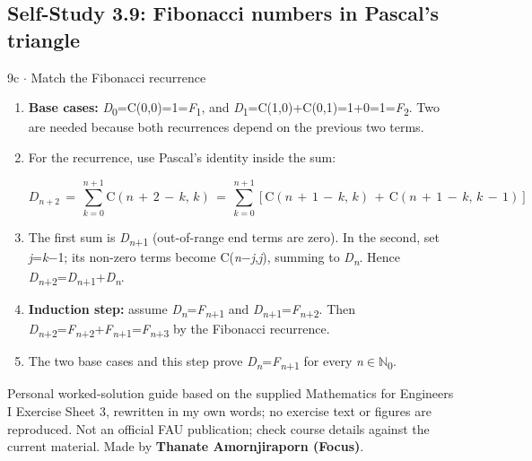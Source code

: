 \documentclass[11pt]{article}
\begin{document}
\begin{keepsection}\subsection{Self-Study 3.9: Fibonacci numbers in Pascal’s triangle}

\begin{workedbox}{9c \ensuremath{\cdot} Match the Fibonacci recurrence}
\begin{enumerate}
\item \textbf{Base cases:} \textit{D}\textsubscript{0}=C(0,0)=1=\textit{F}\textsubscript{1}, and \textit{D}\textsubscript{1}=C(1,0)+C(0,1)=1+0=1=\textit{F}\textsubscript{2}. Two are needed because both recurrences depend on the previous two terms.
\item {}
For the recurrence, use Pascal’s identity inside the sum:

\begin{equation*}{D}_{{n}+2}\, =\, \sum_{{k}=0}^{{n}+1} \mathrm{C}({n}\, +\, 2\, -\, {k},\, {k})\, =\, \sum_{{k}=0}^{{n}+1} [\mathrm{C}({n}\, +\, 1\, -\, {k},\, {k})\, +\, \mathrm{C}({n}\, +\, 1\, -\, {k},\, {k}\, -\, 1)]\end{equation*}
\item The first sum is \textit{D}\textsubscript{\textit{n}+1} (out-of-range end terms are zero). In the second, set \textit{j}=\textit{k}\ensuremath{-}1; its non-zero terms become C(\textit{n}\ensuremath{-}\textit{j},\textit{j}), summing to \textit{D}\textsubscript{\textit{n}}. Hence \textit{D}\textsubscript{\textit{n}+2}=\textit{D}\textsubscript{\textit{n}+1}+\textit{D}\textsubscript{\textit{n}}.
\item \textbf{Induction step:} assume \textit{D}\textsubscript{\textit{n}}=\textit{F}\textsubscript{\textit{n}+1} and \textit{D}\textsubscript{\textit{n}+1}=\textit{F}\textsubscript{\textit{n}+2}. Then \textit{D}\textsubscript{\textit{n}+2}=\textit{F}\textsubscript{\textit{n}+2}+\textit{F}\textsubscript{\textit{n}+1}=\textit{F}\textsubscript{\textit{n}+3} by the Fibonacci recurrence.
\item The two base cases and this step prove \textit{D}\textsubscript{\textit{n}}=\textit{F}\textsubscript{\textit{n}+1} for every \textit{n}\ensuremath{\in}\ensuremath{\mathbb{N}}\textsubscript{0}.
\end{enumerate}
\end{workedbox}

\end{keepsection}

\vfill{\small Personal worked-solution guide based on the supplied Mathematics for Engineers I Exercise Sheet 3, rewritten in my own words; no exercise text or figures are reproduced. Not an official FAU publication; check course details against the current material. Made by \textbf{Thanate Amornjiraporn (Focus)}.}
\end{document}
